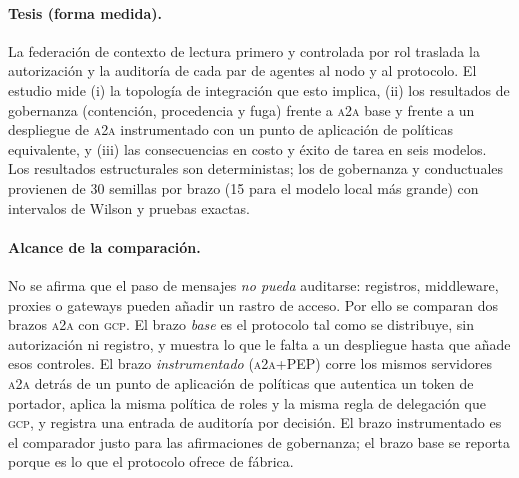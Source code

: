 \documentclass[conference,letterpaper]{IEEEtran}
\newcommand{\gcp}{\textsc{gcp}}
\newcommand{\ata}{\textsc{a2a}}
\begin{document}
\paragraph{Tesis (forma medida).} La federación de contexto de lectura primero y controlada por rol traslada la autorización y la auditoría de cada par de agentes al nodo y al protocolo. El estudio mide (i) la topología de integración que esto implica, (ii) los resultados de gobernanza (contención, procedencia y fuga) frente a \ata{} base y frente a un despliegue de \ata{} instrumentado con un punto de aplicación de políticas equivalente, y (iii) las consecuencias en costo y éxito de tarea en seis modelos. Los resultados estructurales son deterministas; los de gobernanza y conductuales provienen de 30 semillas por brazo (15 para el modelo local más grande) con intervalos de Wilson y pruebas exactas.

\paragraph{Alcance de la comparación.} No se afirma que el paso de mensajes \emph{no pueda}
auditarse: registros, middleware, proxies o gateways pueden añadir un rastro de acceso. Por ello se
comparan dos brazos \ata{} con \gcp{}. El brazo \emph{base} es el protocolo tal como se distribuye, sin
autorización ni registro, y muestra lo que le falta a un despliegue hasta que añade esos controles. El
brazo \emph{instrumentado} (\ata{}+PEP) corre los mismos servidores \ata{} detrás de un punto de
aplicación de políticas que autentica un token de portador, aplica la misma política de roles y la
misma regla de delegación que \gcp{}, y registra una entrada de auditoría por decisión. El brazo
instrumentado es el comparador justo para las afirmaciones de gobernanza; el brazo base se reporta
porque es lo que el protocolo ofrece de fábrica.
\end{document}
